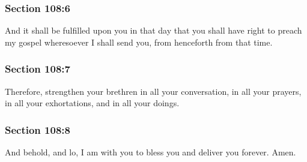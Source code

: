 	\subsubsection{Section 108:6} %
		\label{DC108-6}

		And it shall be fulfilled upon you in that day that you shall have right to preach my gospel wheresoever I shall send you, from henceforth from that time.


	\subsubsection{Section 108:7} %
		\label{DC108-7}

		Therefore, strengthen your brethren in all your conversation, in all your prayers, in all your exhortations, and in all your doings.


	\subsubsection{Section 108:8} %
		\label{DC108-8}

		And behold, and lo, I am with you to bless you and deliver you forever.  Amen.


